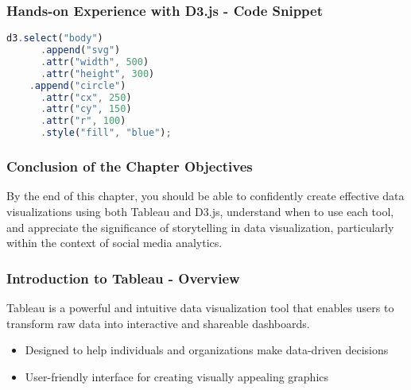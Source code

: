 \documentclass{beamer}
\begin{document}
\begin{frame}[fragile]
    \frametitle{Hands-on Experience with D3.js - Code Snippet}
    \begin{lstlisting}[language=JavaScript]
    d3.select("body")
      .append("svg")
      .attr("width", 500)
      .attr("height", 300)
    .append("circle")
      .attr("cx", 250)
      .attr("cy", 150)
      .attr("r", 100)
      .style("fill", "blue");
    \end{lstlisting}
\end{frame}

\begin{frame}[fragile]
    \frametitle{Conclusion of the Chapter Objectives}
    By the end of this chapter, you should be able to confidently create effective data visualizations using both Tableau and D3.js, understand when to use each tool, and appreciate the significance of storytelling in data visualization, particularly within the context of social media analytics.
\end{frame}

\begin{frame}[fragile]
    \frametitle{Introduction to Tableau - Overview}
    Tableau is a powerful and intuitive data visualization tool that enables users to transform raw data into interactive and shareable dashboards. 
    \begin{itemize}
        \item Designed to help individuals and organizations make data-driven decisions
        \item User-friendly interface for creating visually appealing graphics
    \end{itemize}
\end{frame}
\end{document}
